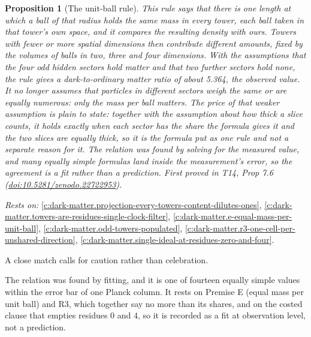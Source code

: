 \documentclass[11pt]{article}
\newtheorem{proposition}[theorem]{Proposition}
\theoremstyle{definition}
\theoremstyle{plain}
\begin{document}
\begin{proposition}[The unit-ball rule]\label{c:dark-matter.unit-ball-rule}
This rule says that there is one length at which a ball of that radius holds the same mass in every tower, each ball taken in that tower's own space, and it compares the resulting density with ours. Towers with fewer or more spatial dimensions then contribute different amounts, fixed by the volumes of balls in two, three and four dimensions. With the assumptions that the four odd hidden sectors hold matter and that two further sectors hold none, the rule gives a dark-to-ordinary matter ratio of about 5.364, the observed value. It no longer assumes that particles in different sectors weigh the same or are equally numerous: only the mass per ball matters. The price of that weaker assumption is plain to state: together with the assumption about how thick a slice counts, it holds exactly when each sector has the share the formula gives it and the two slices are equally thick, so it is the formula put as one rule and not a separate reason for it. The relation was found by solving for the measured value, and many equally simple formulas land inside the measurement's error, so the agreement is a fit rather than a prediction.
\emph{First proved in} T14, Prop 7.6 (\href{https://doi.org/10.5281/zenodo.22722953}{doi:10.5281/zenodo.22722953}).
\end{proposition}
\noindent\emph{Rests on:} \ref{c:dark-matter.projection-every-towers-content-dilutes-ones}, \ref{c:dark-matter.towers-are-residues-single-clock-filter}, \ref{c:dark-matter.e-equal-mass-per-unit-ball}, \ref{c:dark-matter.odd-towers-populated}, \ref{c:dark-matter.r3-one-cell-per-unshared-direction}, \ref{c:dark-matter.single-ideal-at-residues-zero-and-four}.

A close match calls for caution rather than celebration.

The relation was found by fitting, and it is one of fourteen equally simple values within the error bar of one Planck column. It rests on Premise E (equal mass per unit ball) and R3, which together say no more than its shares, and on the costed clause that empties residues $0$ and $4$, so it is recorded as a fit at observation level, not a prediction.
\end{document}
